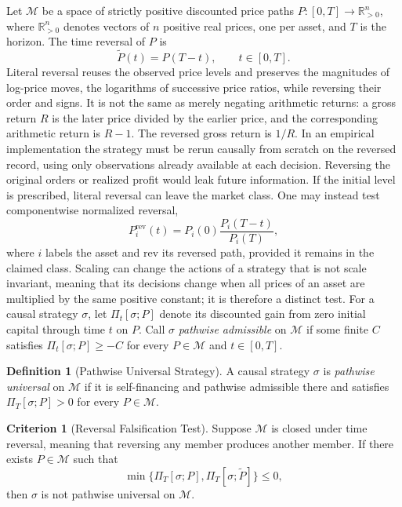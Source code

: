 \documentclass[aps,pra,reprint,superscriptaddress,amsmath,amssymb,floatfix]{revtex4-2}
\theoremstyle{plain}
\theoremstyle{definition}
\newtheorem{definition}{Definition}
\newtheorem{criterion}{Criterion}
\theoremstyle{remark}
\begin{document}
Let \(\mathcal{M}\) be a space of strictly positive discounted price paths
\(P\colon[0,T]\to\mathbb{R}_{>0}^n\), where \(\mathbb{R}_{>0}^n\) denotes
vectors of \(n\) positive real prices, one per asset, and \(T\) is the horizon. The time reversal of \(P\) is
\begin{equation}
  \widetilde{P}(t)=P(T-t), \qquad t\in[0,T].
  \label{eq:timereversal}
\end{equation}
Literal reversal reuses the observed price levels and preserves the magnitudes
of log-price moves, the logarithms of successive price ratios, while reversing
their order and signs. It is not the same as merely negating arithmetic
returns: a gross return \(R\) is the later price divided by the earlier price,
and the corresponding arithmetic return is \(R-1\). The reversed gross return
is \(1/R\). In an empirical implementation
the strategy must be rerun causally from scratch on the reversed record,
using only observations already available at each decision. Reversing the
original orders or realized profit would leak future information.
If the initial level is prescribed, literal reversal can leave the market
class. One may instead test componentwise normalized reversal,
\[
  P_i^{\mathrm{rev}}(t)=P_i(0)\frac{P_i(T-t)}{P_i(T)},
\]
where \(i\) labels the asset and \(\mathrm{rev}\) its reversed path,
provided it remains in the claimed class. Scaling can change the actions of a
strategy that is not scale invariant, meaning that its decisions change when
all prices of an asset are multiplied by the same positive constant; it is
therefore a distinct test.
For a causal strategy \(\sigma\), let \(\Pi_t[\sigma;P]\) denote its discounted
gain from zero initial capital through time \(t\) on \(P\). Call \(\sigma\)
\emph{pathwise admissible} on \(\mathcal M\) if some finite \(C\) satisfies
\(\Pi_t[\sigma;P]\geq-C\) for every \(P\in\mathcal M\) and
\(t\in[0,T]\).

\begin{definition}[Pathwise Universal Strategy]
\label{def:universal}
  A causal strategy \(\sigma\) is \emph{pathwise universal} on
  \(\mathcal{M}\) if it is self-financing and pathwise admissible there and
  satisfies \(\Pi_T[\sigma;P]>0\) for every \(P\in\mathcal{M}\).
\end{definition}

\begin{criterion}[Reversal Falsification Test]
  \label{crit:tr}
  Suppose \(\mathcal{M}\) is closed under time reversal, meaning that reversing
  any member produces another member. If there exists \(P\in\mathcal{M}\) such that
  \begin{equation}
    \min\{\Pi_T[\sigma;P],\Pi_T[\sigma;\widetilde P]\}\leq 0,
    \label{eq:reversaltest}
  \end{equation}
  then \(\sigma\) is not pathwise universal on \(\mathcal{M}\).
\end{criterion}
\end{document}
